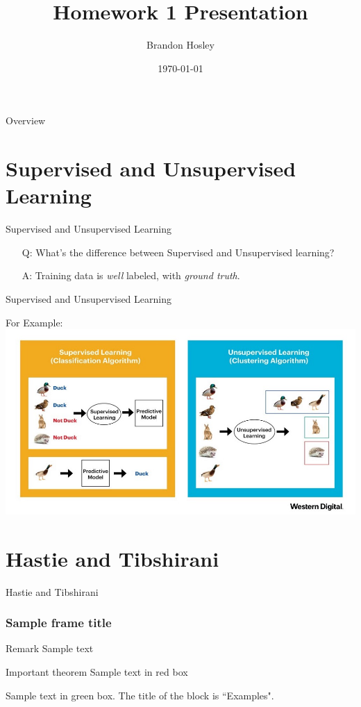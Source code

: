 \documentclass{beamer}
\title{Homework 1 Presentation}
\author{Brandon Hosley}
\institute{University of Illinois - Springfield}
\date{\today}
\begin{document}
\frame{\titlepage}

\begin{frame}{Overview}
\tableofcontents
\end{frame}

\section{Supervised and Unsupervised Learning}
\begin{frame}{Supervised and Unsupervised Learning}
\begin{itemize}[<+->]
	\item[Q:] What's the difference between Supervised and Unsupervised learning? \\
	\item[A:] Training data is \emph{well} labeled, with \emph{ground truth}.
\end{itemize}
\end{frame}

\begin{frame}{Supervised and Unsupervised Learning}
\twocolumn[]
\end{frame}

\begin{frame}{For Example:}
\includegraphics[width=\linewidth]{SupVsUnsup}
\end{frame}


\section{Hastie and Tibshirani}

\begin{frame}{Hastie and Tibshirani}

\end{frame}

\begin{frame}
\frametitle{Sample frame title}
\begin{block}{Remark}
	Sample text
\end{block}

\begin{alertblock}{Important theorem}
	Sample text in red box
\end{alertblock}

\begin{examples}
	Sample text in green box. The title of the block is ``Examples".
\end{examples}

\end{frame}
\end{document}
